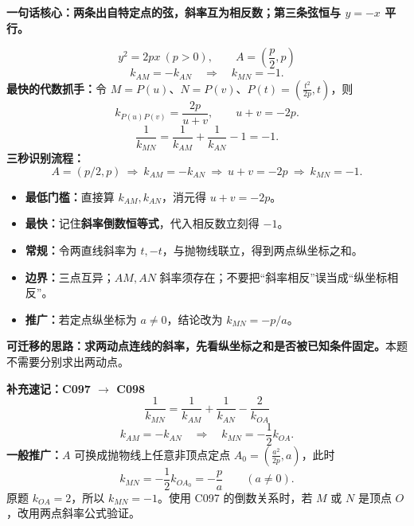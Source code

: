 \clearpage
\begin{summarybox}
\textbf{\textcolor{CSummary}{一句话核心：两条出自特定点的弦，斜率互为相反数；第三条弦恒与 $y=-x$ 平行。}}

\[
 \boxed{y^2=2px\ (p>0),\qquad A=\left(\frac p2,p\right)}
\]
\[
 \boxed{k_{AM}=-k_{AN}\quad\Longrightarrow\quad k_{MN}=-1}.
\]
\textbf{最快的代数抓手：}令 $M=P(u)$、$N=P(v)$、$P(t)=(\frac{t^2}{2p},t)$，则
\[
 \boxed{k_{P(u)P(v)}=\frac{2p}{u+v}},\qquad
 \boxed{u+v=-2p}.
\]
\[
 \boxed{\frac1{k_{MN}}=\frac1{k_{AM}}+\frac1{k_{AN}}-1=-1}.
\]
\textbf{三秒识别流程：}
\[
 \boxed{A=(p/2,p)}\ \Longrightarrow\
 \boxed{k_{AM}=-k_{AN}}\ \Longrightarrow\
 \boxed{u+v=-2p}\ \Longrightarrow\
 \boxed{k_{MN}=-1}.
\]
\begin{itemize}[leftmargin=*,itemsep=0.36em]
 \item \textbf{最低门槛：}直接算 $k_{AM},k_{AN}$，消元得 $u+v=-2p$。
 \item \textbf{最快：}记住\textbf{斜率倒数恒等式}，代入相反数立刻得 $-1$。
 \item \textbf{常规：}令两直线斜率为 $t,-t$，与抛物线联立，得到两点纵坐标之和。
 \item \textbf{边界：}三点互异；$AM,AN$ 斜率须存在；不要把“斜率相反”误当成“纵坐标相反”。
 \item \textbf{推广：}若定点纵坐标为 $a\ne0$，结论改为 $k_{MN}=-p/a$。
\end{itemize}
\textbf{\textcolor{CSummary}{可迁移的思路：}}\textbf{求两动点连线的斜率，先看纵坐标之和是否被已知条件固定。}本题不需要分别求出两动点。
\end{summarybox}


\clearpage
\begin{summarybox}
\textbf{补充速记：C097 $\longrightarrow$ C098}
\[
 \boxed{\frac1{k_{MN}}=\frac1{k_{AM}}+\frac1{k_{AN}}-\frac2{k_{OA}}}
\]
\[
 k_{AM}=-k_{AN}\quad\Longrightarrow\quad
 \boxed{k_{MN}=-\frac12k_{OA}}.
\]
\textbf{一般推广：}$A$ 可换成抛物线上任意非顶点定点 $A_0=(\frac{a^2}{2p},a)$，此时
\[
 \boxed{k_{MN}=-\frac12k_{OA_0}=-\frac pa}\qquad(a\ne0).
\]
原题 $k_{OA}=2$，所以 $k_{MN}=-1$。使用 C097 的倒数关系时，若 $M$ 或 $N$ 是顶点 $O$，改用两点斜率公式验证。
\end{summarybox}
